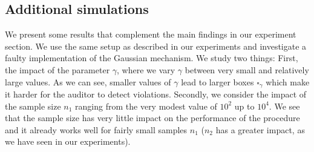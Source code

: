 \subsection{Additional simulations}

We present some results that complement the main findings in our experiment section. We use the same setup as described in our experiments and investigate a faulty implementation of the Gaussian mechanism. We study two things: First, the impact of the parameter $\gamma$, where we vary $\gamma$ between very small and relatively large values. As we can see, smaller values of $\gamma$ lead to larger boxes $\square_\gamma$ which make it harder for the auditor to detect violations. Secondly, we consider the impact of the sample size $n_1$ ranging from the very modest value of $10^2$ up to $10^4$. We see that the sample size has very little impact on the performance of the procedure and it already works well for fairly small samples $n_1$ ($n_2$ has a greater impact, as we have seen in our experiments).
